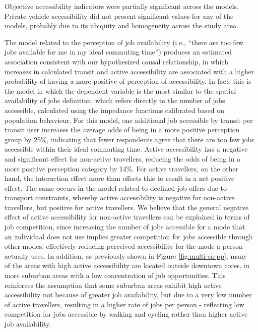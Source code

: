 \documentclass[preprint, 3p,
authoryear]{elsarticle} %
\begin{document}
Objective accessibility indicators were partially significant across the
models. Private vehicle accessibility did not present significant values
for any of the models, probably due to its ubiquity and homogeneity
across the study area.

The model related to the perception of job availability (i.e., ``there
are too few jobs available for me in my ideal commuting time'') produces
an estimated association consistent with our hypothesized causal
relationship, in which increases in calculated transit and active
accessibility are associated with a higher probability of having a more
positive of perception of accessibility. In fact, this is the model in
which the dependent variable is the most similar to the spatial
availability of jobs definition, which refers directly to the number of
jobs accessible, calculated using the impedance functions calibrated
based on population behaviour. For this model, one additional job
accessible by transit per transit user increases the average odds of
being in a more positive perception group by 25\%, indicating that fewer
respondents agree that there are too few jobs accessible within their
ideal commuting time. Active accessibility has a negative and
significant effect for non-active travellers, reducing the odds of being
in a more positive perception category by 14\%. For active travellers,
on the other hand, the interaction effect more than offsets this to
result in a net positive effect. The same occurs in the model related to
declined job offers due to transport constraints, whereby active
accessibility is negative for non-active travellers, but positive for
active travellers. We believe that the general negative effect of active
accessibility for non-active travellers can be explained in terms of job
competition, since increasing the number of jobs accessible for a mode
that an individual does not use implies greater competition for jobs
accessible through other modes, effectively reducing perceived
accessibility for the mode a person actually uses. In addition, as
previously shown in Figure \ref{fig:multi-sa-pp}, many of the areas with
high active accessibility are located outside downtown cores, in more
suburban areas with a low concentration of job opportunities. This
reinforces the assumption that some suburban areas exhibit high active
accessibility not because of greater job availability, but due to a very
low number of active travellers, resulting in a higher rate of jobs per
person - reflecting low competition for jobs accessible by walking and
cycling rather than higher active job availability.
\end{document}

